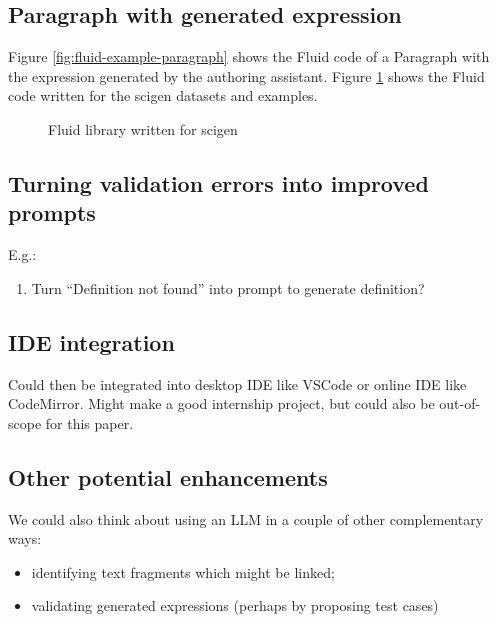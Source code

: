 \subsection{Paragraph with generated expression}
\label{subsec:paragraph-with-generated-expression}
Figure \ref{fig:fluid-example-paragraph} shows the Fluid code of a Paragraph with the expression generated by the authoring assistant.
Figure \ref{fig:fluid-scigen} shows the Fluid code written for the scigen datasets and examples.

\begin{figure}[h]
    \small
    {}
    \caption{Fluid library written for scigen}
    \label{fig:fluid-scigen}
\end{figure}

\subsection{Turning validation errors into improved prompts}\label{subsec:turning-validation-errors-into-improved-prompts}
E.g.:
\begin{enumerate}
\item Turn ``Definition not found'' into prompt to generate definition?
\end{enumerate}

\subsection{IDE integration}\label{subsec:ide-integration}

Could then be integrated into desktop IDE like VSCode or online IDE like CodeMirror. Might make a good
internship project, but could also be out-of-scope for this paper.

\subsection{Other potential enhancements}\label{subsec:other-potential-enhancements}

We could also think about using an LLM in a couple of other complementary ways:
\begin{itemize}
\item identifying text fragments which might be linked;
\item validating generated expressions (perhaps by proposing test cases)
\end{itemize}


